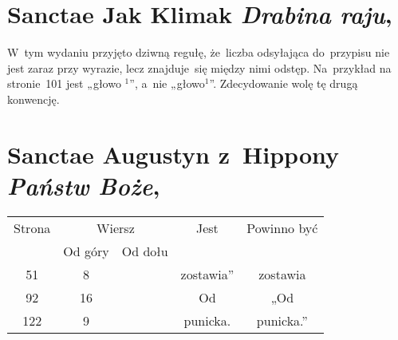 \documentclass[a4paper,11pt]{article}
\numberwithin{equation}{section}
\begin{document}
\VerSpaceTwo












\section{Sanctae Jak Klimak \textit{Drabina raju},
  \parencite{SancteJanKlimakDrabinaRaju2011}}




\vspace{0em}


\noindent
W~tym wydaniu przyjęto dziwną regułę, że~liczba odsyłająca do~przypisu nie
jest zaraz przy wyrazie, lecz znajduje~się między nimi odstęp. Na~przykład
na stronie~101 jest „głowo $^{ 1 }$”, a~nie „głowo$^{ 1 }$”. Zdecydowanie
wolę tę drugą konwencję.



\VerSpaceTwo












\section{Sanctae Augustyn z~Hippony
  \textit{Państw Boże}, \cite{}}







\begin{center}

  \begin{tabular}{|c|c|c|c|c|}
    \hline
    Strona & \multicolumn{2}{c|}{Wiersz} & Jest
                              & Powinno być \\ \cline{2-3}
    & Od góry & Od dołu & & \\
    \hline
    \hphantom{0}51 & \hphantom{0}8 & & zostawia” & zostawia \\
    \hphantom{0}92 & 16 & & Od & „Od \\
    122 & \hphantom{0}9 & & punicka. & punicka.” \\
    \hline
  \end{tabular}

\end{center}
\end{document}
